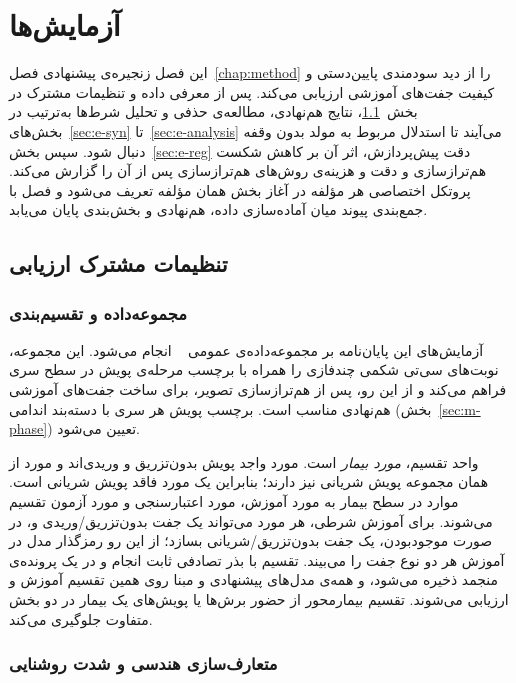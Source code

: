 \chapter{آزمایش‌ها}
\label{chap:experiments}

این فصل زنجیره‌ی پیشنهادی فصل~\ref{chap:method} را از دید سودمندی پایین‌دستی و کیفیت جفت‌های آموزشی ارزیابی می‌کند. پس از معرفی داده و تنظیمات مشترک در بخش~\ref{sec:e-setup}، نتایج هم‌نهادی، مطالعه‌ی حذفی و تحلیل شرط‌ها به‌ترتیب در بخش‌های~\ref{sec:e-syn} تا~\ref{sec:e-analysis} می‌آیند تا استدلال مربوط به مولد بدون وقفه دنبال شود. سپس بخش~\ref{sec:e-reg} دقت پیش‌پردازش، اثر آن بر کاهش شکست هم‌ترازسازی و دقت و هزینه‌ی روش‌های هم‌ترازسازی پس از آن را گزارش می‌کند. پروتکل اختصاصی هر مؤلفه در آغاز بخش همان مؤلفه تعریف می‌شود و فصل با جمع‌بندی پیوند میان آماده‌سازی داده، هم‌نهادی و بخش‌بندی پایان می‌یابد.

\section{تنظیمات مشترک ارزیابی}
\label{sec:e-setup}

\subsection{مجموعه‌داده و تقسیم‌بندی}
\label{sec:m-data}


آزمایش‌های این پایان‌نامه بر مجموعه‌داده‌ی عمومی ~\cite{zhou2021phaserecog} انجام می‌شود. این مجموعه، نوبت‌های سی‌تی شکمی چندفازی را همراه با برچسب مرحله‌ی پویش در سطح سری فراهم می‌کند و از این رو، پس از هم‌ترازسازی تصویر، برای ساخت جفت‌های آموزشی هم‌نهادی مناسب است. برچسب پویش هر سری با دسته‌بند اندامی (بخش~\ref{sec:m-phase}) تعیین می‌شود.

واحد تقسیم، \emph{مورد بیمار} است.  مورد واجد پویش بدون‌تزریق و وریدی‌اند و  مورد از همان مجموعه پویش شریانی نیز دارند؛ بنابراین یک مورد فاقد پویش شریانی است. موارد در سطح بیمار به  مورد آموزش،  مورد اعتبارسنجی و  مورد آزمون تقسیم می‌شوند. برای آموزش شرطی، هر مورد می‌تواند یک جفت بدون‌تزریق/وریدی و، در صورت موجودبودن، یک جفت بدون‌تزریق/شریانی بسازد؛ از این رو رمزگذار مدل در آموزش هر دو نوع جفت را می‌بیند. تقسیم با بذر تصادفی ثابت انجام و در یک پرونده‌ی منجمد ذخیره می‌شود، و همه‌ی مدل‌های پیشنهادی و مبنا روی همین تقسیم آموزش و ارزیابی می‌شوند. تقسیم بیمارمحور از حضور برش‌ها یا پویش‌های یک بیمار در دو بخش متفاوت جلوگیری می‌کند.

\subsection{متعارف‌سازی هندسی و شدت روشنایی}


